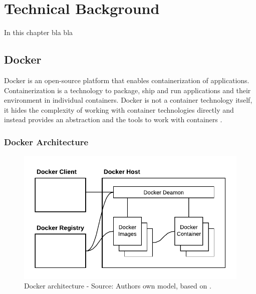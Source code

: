 \chapter{Technical Background}
\label{chap:04_background}
%
In this chapter bla bla


\section{Docker}
\label{sec:04_docker}
Docker is an open-source platform that enables containerization of applications. Containerization is a technology to package, ship and run applications and their environment in individual containers.
Docker is not a container technology itself, it hides the complexity of working with container technologies directly and instead provides an abstraction and the tools to work with containers \cite{Nickoloff2019Docker, Bullington2020Docker, Potdar2020Docker}.


\subsection{Docker Architecture}
\label{subsec:04_docker_architecture}
\begin{figure}[h]
\centering
\includegraphics[scale=1]{images/04_technical_background/docker/docker_architecture}
\caption{Docker architecture - Source: Authors own model, based on \cite{Docker2020Docs}.}
\label{fig:04_docker_architecture_architecture}
\end{figure}

